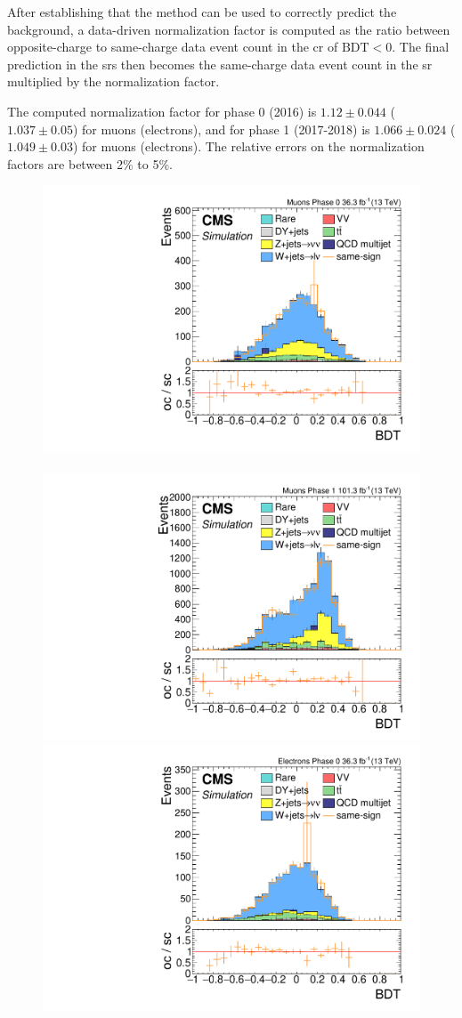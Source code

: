 After establishing that the method can be used to correctly predict the background, a data-driven normalization factor is computed as the ratio between opposite-charge to same-charge data event count in the \gls{cr} of $\text{BDT} < 0$. The final prediction in the \glspl{sr} then becomes the same-charge data event count in the \gls{sr} multiplied by the normalization factor.

The computed normalization factor for phase 0 (2016) is $1.12\pm 0.044$ ($1.037\pm 0.05$) for muons (electrons), and for phase 1 (2017-2018) is $1.066\pm 0.024$ ($1.049\pm 0.03$) for muons (electrons). The relative errors on the normalization factors are between 2\% to 5\%.


\begin{figure}[!htb]
\centering
\includegraphics[width=0.48\linewidth]{plots/track_muon_sc_comparison/none_exTrack_dilepBDTCorrJetNoMultIso10Dr0.6.pdf} \,
\includegraphics[width=0.48\linewidth]{plots/track_muon_sc_comparison_phase1/none_exTrack_dilepBDTCorrJetNoMultIso10Dr0.6.pdf}  \\
\includegraphics[width=0.48\linewidth]{plots/track_electron_sc_comparison/none_exTrack_dilepBDTCorrJetNoMultIso10Dr0.5.pdf} \,

\end{figure}
